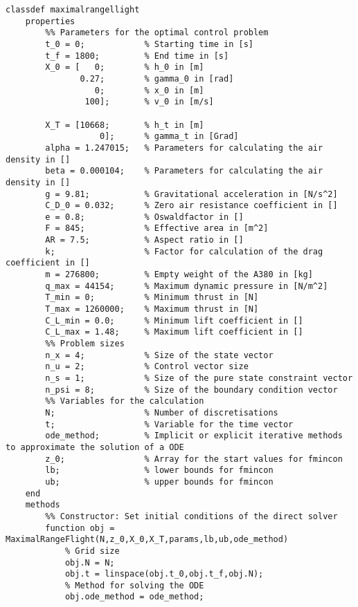 \begin{lstlisting}[style=num_octave, caption={Matlab Programmcode von \texttt{maximalrangeflight.m}.}, label=code:direct_maximalrangeflight]
classdef maximalrangellight
    properties
        %% Parameters for the optimal control problem
        t_0 = 0;            % Starting time in [s]
        t_f = 1800;         % End time in [s]
        X_0 = [   0;        % h_0 in [m]
               0.27;        % gamma_0 in [rad]
                  0;        % x_0 in [m]
                100];       % v_0 in [m/s]

        X_T = [10668;       % h_t in [m]
                   0];      % gamma_t in [Grad]
        alpha = 1.247015;   % Parameters for calculating the air density in []
        beta = 0.000104;    % Parameters for calculating the air density in []
        g = 9.81;           % Gravitational acceleration in [N/s^2]
        C_D_0 = 0.032;      % Zero air resistance coefficient in []             
        e = 0.8;            % Oswaldfactor in []
        F = 845;            % Effective area in [m^2]
        AR = 7.5;           % Aspect ratio in []
        k;                  % Factor for calculation of the drag coefficient in []
        m = 276800;         % Empty weight of the A380 in [kg]
        q_max = 44154;      % Maximum dynamic pressure in [N/m^2]
        T_min = 0;          % Minimum thrust in [N]
        T_max = 1260000;    % Maximum thrust in [N]
        C_L_min = 0.0;      % Minimum lift coefficient in []
        C_L_max = 1.48;     % Maximum lift coefficient in []
        %% Problem sizes
        n_x = 4;            % Size of the state vector
        n_u = 2;            % Control vector size
        n_s = 1;            % Size of the pure state constraint vector
        n_psi = 8;          % Size of the boundary condition vector
        %% Variables for the calculation
        N;                  % Number of discretisations
        t;                  % Variable for the time vector
        ode_method;         % Implicit or explicit iterative methods to approximate the solution of a ODE
        z_0;                % Array for the start values for fmincon
        lb;                 % lower bounds for fmincon
        ub;                 % upper bounds for fmincon
    end
    methods
        %% Constructor: Set initial conditions of the direct solver
        function obj = MaximalRangeFlight(N,z_0,X_0,X_T,params,lb,ub,ode_method)
            % Grid size
            obj.N = N;
            obj.t = linspace(obj.t_0,obj.t_f,obj.N);
            % Method for solving the ODE
            obj.ode_method = ode_method;

\end{lstlisting}
